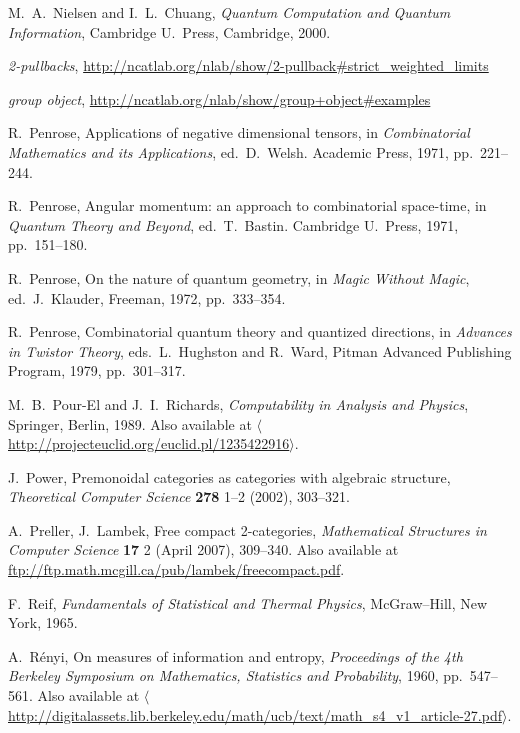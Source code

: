 \documentclass[12pt,twoside,openright]{report}
\begin{document}
\begin{thebibliography}{99}
 M.\ A.\ Nielsen and I.\ L.\ Chuang,
{\sl Quantum Computation and Quantum Information}, Cambridge U.\ 
Press, Cambridge, 2000.

 {\sl 2-pullbacks}, 
\href{http://ncatlab.org/nlab/show/2-pullback#strict_weighted_limits}
{http://ncatlab.org/nlab/show/2-pullback\#strict\_weighted\_limits}

 {\sl group object}, 
\href{http://ncatlab.org/nlab/show/group+object#examples}
{http://ncatlab.org/nlab/show/group+object\#examples}
 
R.\ Penrose, Applications of negative dimensional tensors, in \textsl{Combinatorial Mathematics and its Applications}, ed.\
D.~Welsh. Academic Press, 1971, pp.\ 221--244.

R.\ Penrose, Angular momentum: an approach to combinatorial space-time, in \textsl{Quantum Theory and Beyond}, ed.\
T.~Bastin. Cambridge U.\ Press, 1971, pp.\ 151--180.

R.\ Penrose, On the nature of quantum geometry, in \textsl{Magic Without Magic}, ed.\ J.\ Klauder, Freeman, 1972, pp.\ 333--354.

R.\ Penrose, Combinatorial quantum theory and quantized directions, in \textsl{Advances in Twistor Theory}, eds.\ L.\ Hughston and R.\ Ward, Pitman Advanced Publishing Program, 1979, pp.\ 301--317.

 M.\ B.\ Pour-El and J.\ I.\ Richards,
\textsl{Computability in Analysis and Physics}, Springer, Berlin, 1989. Also available at \href{http://projecteuclid.org/euclid.pl/1235422916}
{$\langle$http://projecteuclid.org/euclid.pl/1235422916$\rangle$}.

\bibitem{PowerTCS} J.\ Power, Premonoidal categories as categories with algebraic structure, \textsl{Theoretical Computer Science} \textbf{278} 1--2 (2002), 303--321.

 A.\ Preller, J.\ Lambek, Free compact 2-categories, \textsl{Mathematical Structures in Computer Science} \textbf{17} 2 (April 2007), 309--340.  Also available at \href{ftp://ftp.math.mcgill.ca/pub/lambek/freecompact.pdf}{ftp://ftp.math.mcgill.ca/pub/lambek/freecompact.pdf}.

 F.\ Reif, {\sl Fundamentals of Statistical and Thermal Physics}, McGraw--Hill, New York, 1965.

 A.\ R\'enyi, On measures of information and entropy,
\textsl{Proceedings of the 4th Berkeley Symposium on Mathematics, Statistics and Probability}, 1960, pp.\ 547--561.  Also available at
\href{http://digitalassets.lib.berkeley.edu/math/ucb/text/math_s4_v1_article-27.pdf}
{$\langle$http://digitalassets.lib.berkeley.edu/math/ucb/text/math\_s4\_v1\_article-27.pdf$\rangle$}.


\end{thebibliography}
\end{document}
